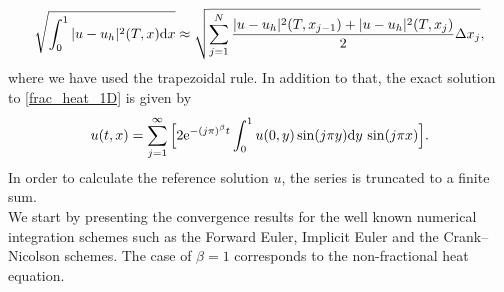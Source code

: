 \begin{equation*} \label{l2norm}
\sqrt{\int_0^1 |u - u_h|^2(T,x) \text{d} x} \approx \sqrt{\sum_{j=1}^{N}\frac{|u-u_h|^2(T,x_{j-1}) + |u-u_h|^2(T,x_j)}{2}\Delta x_j}, 
\end{equation*}
where we have used the trapezoidal rule. In addition to that, the exact solution to \eqref{frac_heat_1D} is given by
\begin{equation*} \label{ref_sol}
u(t,x) = \sum_{j=1}^{\infty}\Big[2\text{e}^{-(j\pi)^{\beta}t}\int_0^1u(0,y)\sin(j\pi y)\text{d} y\,\sin(j\pi x)\Big]. 
\end{equation*}
In order to calculate the reference solution $u$, the series is truncated to a finite sum. \\
We start by presenting the convergence results for the well known numerical integration schemes such as the Forward Euler, Implicit Euler and the Crank--Nicolson schemes. The case of $\beta =1$ corresponds to the non-fractional heat equation.
